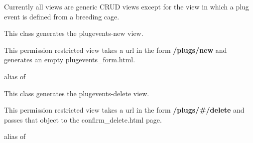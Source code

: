 \documentclass[letterpaper,10pt,english]{sphinxmanual}
\begin{document}
Currently all views are generic CRUD views except for the view in which a plug event is defined from a breeding cage.

\begin{fulllineitems}
\label{timed_mating:mousedb.timed_mating.views.PlugEventsCreate}
This class generates the plugevents-new view.

This permission restricted view takes a url in the form \textbf{/plugs/new} and generates an empty plugevents\_form.html.

\begin{fulllineitems}
\label{timed_mating:mousedb.timed_mating.views.PlugEventsCreate.model}
alias of 

\end{fulllineitems}


\end{fulllineitems}


\begin{fulllineitems}
\label{timed_mating:mousedb.timed_mating.views.PlugEventsDelete}
This class generates the plugevents-delete view.

This permission restricted view takes a url in the form \textbf{/plugs/\#/delete} and passes that object to the confirm\_delete.html page.

\begin{fulllineitems}
\label{timed_mating:mousedb.timed_mating.views.PlugEventsDelete.model}
alias of 

\end{fulllineitems}


\end{fulllineitems}

\end{document}
